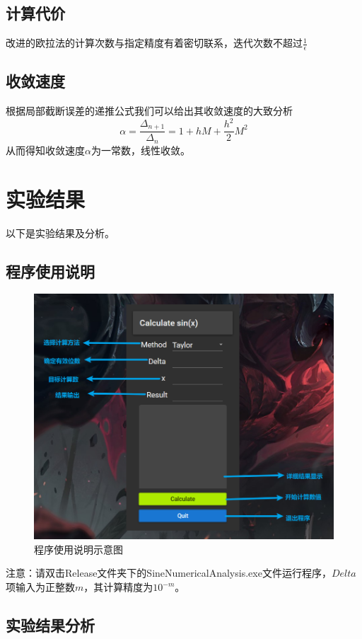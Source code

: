 \documentclass[lang=cn,11pt,a4paper]{elegantpaper}
\begin{document}
\subsection{计算代价}
改进的欧拉法的计算次数与指定精度有着密切联系，迭代次数不超过$\frac{1}{\epsilon}$
\subsection{收敛速度}
根据局部截断误差的递推公式我们可以给出其收敛速度的大致分析
\begin{equation}
  \alpha = \frac{\Delta_{n+1}}{\Delta_{n}} = 1+h M+\frac{h^{2}}{2} M^{2}
\end{equation}
从而得知收敛速度$\alpha$为一常数，线性收敛。
\section{实验结果}
以下是实验结果及分析。
\subsection{程序使用说明}
\begin{figure}[htbp]
    \centering
    \includegraphics[width=0.8\linewidth]{src/D.png}
    \centering
    \caption{程序使用说明示意图}
\end{figure}

注意：请双击Release文件夹下的SineNumericalAnalysis.exe文件运行程序，$Delta$项输入为正整数$m$，其计算精度为$10^{-m}$。
\subsection{实验结果分析}
\end{document}
